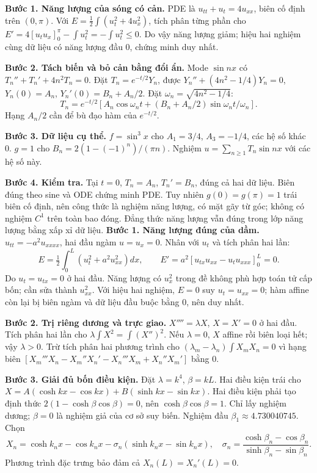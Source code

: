 \textbf{Bước 1. Năng lượng của sóng có cản.} PDE là $u_{tt}+u_t=4u_{xx}$, biên cố định trên $(0,\pi)$. Với $E=\frac12\int(u_t^2+4u_x^2)$, tích phân từng phần cho $E'=4[u_tu_x]_0^\pi-\int u_t^2=-\int u_t^2\le0$. Do vậy năng lượng giảm; hiệu hai nghiệm cùng dữ liệu có năng lượng đầu $0$, chứng minh duy nhất.

\textbf{Bước 2. Tách biến và bỏ cản bằng đổi ẩn.} Mode $\sin nx$ có $T_n''+T_n'+4n^2T_n=0$. Đặt $T_n=e^{-t/2}Y_n$, được $Y_n''+(4n^2-1/4)Y_n=0$, $Y_n(0)=A_n$, $Y_n'(0)=B_n+A_n/2$. Đặt $\omega_n=\sqrt{4n^2-1/4}$:
\[T_n=e^{-t/2}[A_n\cos\omega_nt+(B_n+A_n/2)\sin\omega_nt/\omega_n].\]
Hạng $A_n/2$ cần để bù đạo hàm của $e^{-t/2}$.

\textbf{Bước 3. Dữ liệu cụ thể.} $f=\sin^3x$ cho $A_1=3/4$, $A_3=-1/4$, các hệ số khác $0$. $g=1$ cho $B_n=2(1-(-1)^n)/(\pi n)$. Nghiệm $u=\sum_{n\ge1}T_n\sin nx$ với các hệ số này.

\textbf{Bước 4. Kiểm tra.} Tại $t=0$, $T_n=A_n$, $T_n'=B_n$, đúng cả hai dữ liệu. Biên đúng theo sine và ODE chứng minh PDE. Tuy nhiên $g(0)=g(\pi)=1$ trái biên cố định, nên công thức là nghiệm năng lượng, có mặt gãy từ góc; không có nghiệm $C^1$ trên toàn bao đóng. Đẳng thức năng lượng vẫn đúng trong lớp năng lượng bằng xấp xỉ dữ liệu.
\textbf{Bước 1. Năng lượng đúng của dầm.} $u_{tt}=-a^2u_{xxxx}$, hai đầu ngàm $u=u_x=0$. Nhân với $u_t$ và tích phân hai lần:
\[E=\tfrac12\int_0^L(u_t^2+a^2u_{xx}^2)dx,\qquad E'=a^2[u_{tx}u_{xx}-u_tu_{xxx}]_0^L=0.\]
Do $u_t=u_{tx}=0$ ở hai đầu. Năng lượng có $u_x^2$ trong đề không phù hợp toán tử cấp bốn; cần sửa thành $u_{xx}^2$. Với hiệu hai nghiệm, $E=0$ suy $u_t=u_{xx}=0$; hàm affine còn lại bị biên ngàm và dữ liệu đầu buộc bằng $0$, nên duy nhất.

\textbf{Bước 2. Trị riêng dương và trực giao.} $X''''=\lambda X$, $X=X'=0$ ở hai đầu. Tích phân hai lần cho $\lambda\int X^2=\int(X'')^2$. Nếu $\lambda=0$, $X$ affine rồi biên loại hết; vậy $\lambda>0$. Trừ tích phân hai phương trình cho $(\lambda_m-\lambda_n)\int X_mX_n=0$ vì hạng biên $[X_m'''X_n-X_m''X_n'-X_n'''X_m+X_n''X_m']$ bằng $0$.

\textbf{Bước 3. Giải đủ bốn điều kiện.} Đặt $\lambda=k^4$, $\beta=kL$. Hai điều kiện trái cho $X=A(\cosh kx-\cos kx)+B(\sinh kx-\sin kx)$. Hai điều kiện phải tạo định thức $2(1-\cosh\beta\cos\beta)=0$, nên $\cosh\beta\cos\beta=1$. Chỉ lấy nghiệm dương; $\beta=0$ là nghiệm giả của cơ sở suy biến. Nghiệm đầu $\beta_1\approx4.730040745$. Chọn
\[X_n=\cosh k_nx-\cos k_nx-\sigma_n(\sinh k_nx-\sin k_nx),\quad
\sigma_n=\frac{\cosh\beta_n-\cos\beta_n}{\sinh\beta_n-\sin\beta_n}.\]
Phương trình đặc trưng bảo đảm cả $X_n(L)=X_n'(L)=0$.

